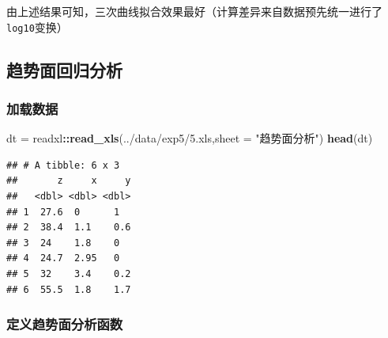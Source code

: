 \documentclass[
]{article}
\newenvironment{Shaded}{\begin{snugshade}}{\end{snugshade}}
\newcommand{\AttributeTok}[1]{\textcolor[rgb]{0.13,0.29,0.53}{#1}}
\newcommand{\FunctionTok}[1]{\textcolor[rgb]{0.13,0.29,0.53}{\textbf{#1}}}
\newcommand{\NormalTok}[1]{#1}
\newcommand{\OtherTok}[1]{\textcolor[rgb]{0.56,0.35,0.01}{#1}}
\newcommand{\SpecialCharTok}[1]{\textcolor[rgb]{0.81,0.36,0.00}{\textbf{#1}}}
\newcommand{\StringTok}[1]{\textcolor[rgb]{0.31,0.60,0.02}{#1}}
\begin{document}
由上述结果可知，三次曲线拟合效果最好（计算差异来自数据预先统一进行了\texttt{log10}变换）

\subsection{趋势面回归分析}\label{ux8d8bux52bfux9762ux56deux5f52ux5206ux6790}

\subsubsection{加载数据}\label{ux52a0ux8f7dux6570ux636e-1}

\begin{Shaded}
\begin{Highlighting}[]
\NormalTok{dt }\OtherTok{=}\NormalTok{ readxl}\SpecialCharTok{::}\FunctionTok{read\_xls}\NormalTok{(}\StringTok{\textquotesingle{}../data/exp5/5.xls\textquotesingle{}}\NormalTok{,}\AttributeTok{sheet =} \StringTok{"趋势面分析"}\NormalTok{)}
\FunctionTok{head}\NormalTok{(dt)}
\end{Highlighting}
\end{Shaded}

\begin{verbatim}
## # A tibble: 6 x 3
##       z     x     y
##   <dbl> <dbl> <dbl>
## 1  27.6  0      1  
## 2  38.4  1.1    0.6
## 3  24    1.8    0  
## 4  24.7  2.95   0  
## 5  32    3.4    0.2
## 6  55.5  1.8    1.7
\end{verbatim}

\subsubsection{定义趋势面分析函数}\label{ux5b9aux4e49ux8d8bux52bfux9762ux5206ux6790ux51fdux6570}
\end{document}
